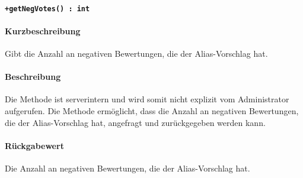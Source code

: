 \paragraph*{\texttt{+getNegVotes() : int}}%
\paragraph*{Kurzbeschreibung}
Gibt die Anzahl an negativen Bewertungen, die der Alias-Vorschlag hat.
\paragraph*{Beschreibung}
Die Methode ist serverintern und wird somit nicht explizit vom Administrator aufgerufen.
Die Methode ermöglicht, dass die Anzahl an negativen Bewertungen, die der Alias-Vorschlag hat, angefragt und zurückgegeben werden kann.
\paragraph*{Rückgabewert}
Die Anzahl an negativen Bewertungen, die der Alias-Vorschlag hat.
